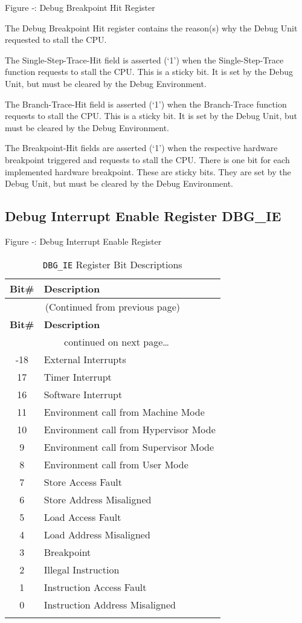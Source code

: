 \missingfigure{}

Figure ‑: Debug Breakpoint Hit Register

The Debug Breakpoint Hit register contains the reason(s) why the Debug
Unit requested to stall the CPU.

The Single-Step-Trace-Hit field is asserted (`1') when the
Single-Step-Trace function requests to stall the CPU. This is a sticky
bit. It is set by the Debug Unit, but must be cleared by the Debug
Environment.

The Branch-Trace-Hit field is asserted (`1') when the Branch-Trace
function requests to stall the CPU. This is a sticky bit. It is set by
the Debug Unit, but must be cleared by the Debug Environment.

The Breakpoint-Hit fields are asserted (`1') when the respective
hardware breakpoint triggered and requests to stall the CPU. There is
one bit for each implemented hardware breakpoint. These are sticky bits.
They are set by the Debug Unit, but must be cleared by the Debug
Environment.

\subsection{Debug Interrupt Enable Register
DBG\_IE}\label{debug-interrupt-enable-register-dbg_ie}

\missingfigure{}

Figure ‑: Debug Interrupt Enable Register


\begin{longtable}[]{@{}cl@{}}
\toprule
\textbf{Bit\#} & \textbf{Description}\tabularnewline
\midrule
\endfirsthead
\multicolumn{2}{c}{{(Continued from previous page)}} \\
\toprule
\textbf{Bit\#} & \textbf{Description}\tabularnewline
\midrule
\endhead
\midrule \multicolumn{2}{c}{{\tablename\ \thetable{} continued on next page\ldots}} \\
\endfoot
\endlastfoot
31-18 & External Interrupts\tabularnewline
17 & Timer Interrupt\tabularnewline
16 & Software Interrupt\tabularnewline
11 & Environment call from Machine Mode\tabularnewline
10 & Environment call from Hypervisor Mode\tabularnewline
9 & Environment call from Supervisor Mode\tabularnewline
8 & Environment call from User Mode\tabularnewline
7 & Store Access Fault\tabularnewline
6 & Store Address Misaligned\tabularnewline
5 & Load Access Fault\tabularnewline
4 & Load Address Misaligned\tabularnewline
3 & Breakpoint\tabularnewline
2 & Illegal Instruction\tabularnewline
1 & Instruction Access Fault\tabularnewline
0 & Instruction Address Misaligned\tabularnewline
\bottomrule
\caption{\texttt{DBG\_IE} Register Bit Descriptions}
\label{tab:dbg-ie-reg-bits}
\end{longtable}

